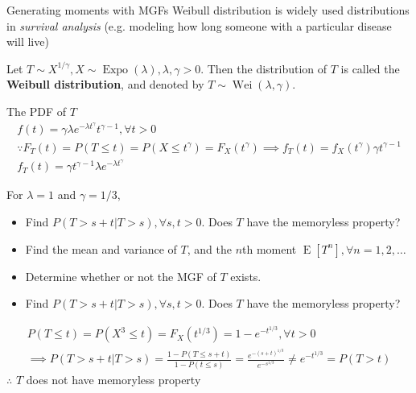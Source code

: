 \documentclass[8pt]{beamer}
\newcommand{\tb}[1]{\textbf{#1}}
\newcommand{\ti}[1]{\textit{#1}}
\newcommand{\myexpo}[1]{\operatorname{Expo}\!\left(#1\right)}
\newcommand{\expec}[1]{\operatorname{E}\left[ #1 \right]}
\newcommand{\mywei}[2]{\operatorname{Wei}\!\left(#1, #2\right)}
\begin{document}
\begin{frame}{Generating moments with MGFs}
    Weibull distribution is widely used distributions in \ti{survival analysis} (e.g. modeling how long someone with a particular disease will live)
    \begin{example}
        Let $T \sim X^{1/ \gamma}, X \sim \myexpo{\lambda}, \lambda,\gamma > 0$. Then the distribution of $T$ is called the \tb{Weibull distribution}, and denoted by $T \sim \mywei{\lambda}{\gamma}$.

        The PDF of $T$
        \[
        \begin{gathered}
            f(t) = \gamma \lambda e^{-\lambda t^{\gamma}}t^{\gamma -1}, \forall t > 0 \\
            \because F_T(t) = P(T\leq t) = P(X \leq t^\gamma) = F_X(t^\gamma) \implies f_T(t) = f_X(t^\gamma) \gamma t^{\gamma -1} \\
            f_T(t) = \gamma t^{\gamma - 1} \lambda e^{-\lambda t^\gamma}
        \end{gathered}
        \] 

        For $\lambda = 1$ and $\gamma = 1/3$,
        \begin{itemize}
            \item Find $P(T > s+t | T> s), \forall s,t > 0$. Does $T$ have the memoryless property?
            \item Find the mean and variance of $T$, and the $n$th moment $\expec{T^n}, \forall n=1,2,\dots$
            \item Determine whether or not the MGF of $T$ exists.
        \end{itemize}
    \end{example}

    \begin{itemize}
        \item Find $P(T > s+t | T> s), \forall s,t > 0$. Does $T$ have the memoryless property?
    \end{itemize}
    \[
    \begin{gathered}
        P(T\leq t) = P(X^3 \leq t) = F_X(t^{1/3}) = 1 - e^{-t^{1/3}}, \forall t>0 \\
        \implies P(T> s+t | T>s) = \frac{1 - P(T \leq s+t)}{1 - P(t \leq s)} = \frac{e^{-(s+t)^{1/3}}}{e^{-s^{1/3}}} \neq e^{-t^{1/3}} = P(T > t)
    \end{gathered}
    \]
    $\therefore$ $T$ does not have memoryless property
\end{frame}
\end{document}
